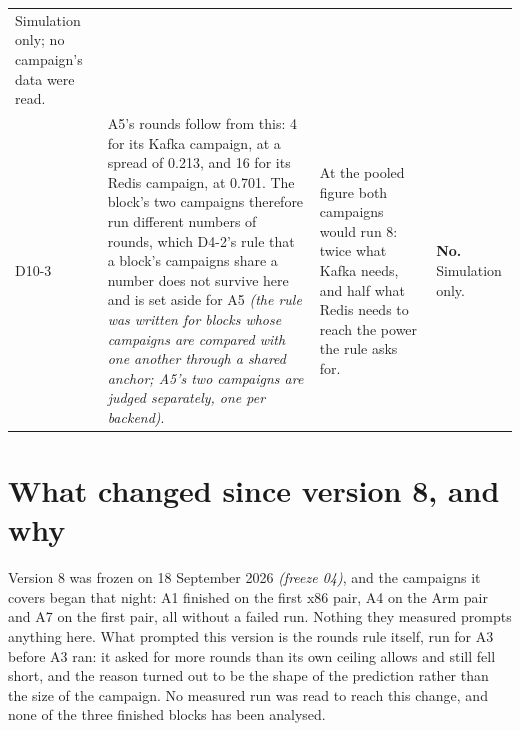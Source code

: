 \documentclass[11pt]{article}
\newcommand{\gl}[1]{{\color{soft}\itshape\small (#1)}}
\begin{document}
{\begin{longtable}{@{}p{1.1cm} >{\raggedright\arraybackslash}p{6.1cm} >{\raggedright\arraybackslash}p{6.0cm} >{\raggedright\arraybackslash}p{2.2cm}@{}}
Simulation only; no campaign's data were read. \\
D10-3 & A5's rounds follow from this: 4 for its Kafka campaign, at a spread of 0.213, and 16 for
its Redis campaign, at 0.701. The block's two campaigns therefore run different numbers of rounds,
which D4-2's rule that a block's campaigns share a number does not survive here and is set aside
for A5 \gl{the rule was written for blocks whose campaigns are compared with one another through a
shared anchor; A5's two campaigns are judged separately, one per backend}. & At the pooled figure
both campaigns would run 8: twice what Kafka needs, and half what Redis needs to reach the power
the rule asks for. & \textbf{No.} Simulation only. \\
\bottomrule
\end{longtable}}

\section*{What changed since version 8, and why}
Version 8 was frozen on 18 September 2026 \gl{freeze 04}, and the campaigns it covers began that
night: A1 finished on the first x86 pair, A4 on the Arm pair and A7 on the first pair, all without
a failed run. Nothing they measured prompts anything here. What prompted this version is the
rounds rule itself, run for A3 before A3 ran: it asked for more rounds than its own ceiling
allows and still fell short, and the reason turned out to be the shape of the prediction rather
than the size of the campaign. No measured run was read to reach this change, and none of the
three finished blocks has been analysed.
\end{document}
